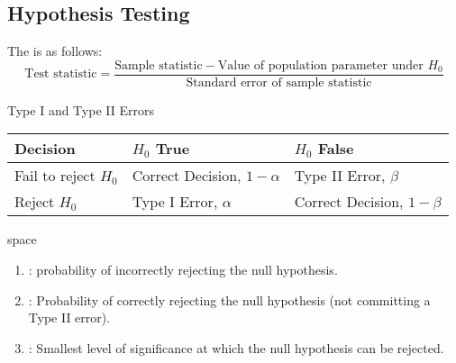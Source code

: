 \subsection{Hypothesis Testing}

\begin{definition}
The  is as follows:
\begin{equation}
\text{Test statistic} = \frac{\text{Sample statistic} - \text{Value of population parameter under } H_0}{\text{Standard error of sample statistic}} \nonumber
\end{equation}
\end{definition}

\begin{flushleft}
Type I and Type II Errors
\begin{tabularx}{\textwidth}{p{11em}|X|X}
\hline
\rowcolor{gray!30}
Decision & $H_0$ True & $H_0$ False \\
\hline
Fail to reject $H_0$ & Correct Decision, $1-\alpha$ & Type II Error, $\beta$ \\
\hline
Reject $H_0$ & Type I Error, $\alpha$ & Correct Decision, $1-\beta$ \\
\hline
\end{tabularx}
\end{flushleft}

\begin{definition} {\color{white}space}
\begin{enumerate}[label=\roman*.]
\setlength{\itemsep}{0pt}
\item {}: probability of incorrectly rejecting the null hypothesis.
\item {}: Probability of correctly rejecting the null hypothesis (not committing a Type II error).
\item {}: Smallest level of significance at which the null hypothesis can be rejected.
\end{enumerate}
\end{definition}

